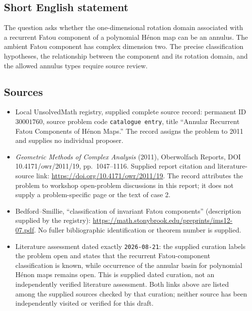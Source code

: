 \documentclass[11pt]{article}
\begin{document}
\subsection{Short English statement}
The question asks whether the one-dimensional rotation domain associated with a recurrent Fatou component of a polynomial H\'enon map can be an annulus. The ambient Fatou component has complex dimension two. The precise classification hypotheses, the relationship between the component and its rotation domain, and the allowed annulus types require source review.
\subsection{Sources}
\begin{itemize}
\item Local UnsolvedMath registry, supplied complete source record: permanent ID \(30001760\), source problem code \texttt{catalogue entry}, title ``Annular Recurrent Fatou Components of H\'enon Maps.'' The record assigns the problem to 2011 and supplies no individual proposer.
\item \emph{Geometric Methods of Complex Analysis} (2011), Oberwolfach Reports, DOI 10.4171/owr/2011/19, pp.\ 1047--1116. Supplied report citation and literature-source link: \url{https://doi.org/10.4171/owr/2011/19}. The record attributes the problem to workshop open-problem discussions in this report; it does not supply a problem-specific page or the text of case 2.
\item Bedford--Smillie, ``classification of invariant Fatou components'' (description supplied by the registry): \url{https://math.stonybrook.edu/preprints/ims12-07.pdf}. No fuller bibliographic identification or theorem number is supplied.
\item Literature assessment dated exactly \texttt{2026-08-21}: the supplied curation labels the problem open and states that the recurrent Fatou-component classification is known, while occurrence of the annular basin for polynomial H\'enon maps remains open. This is supplied dated curation, not an independently verified literature assessment. Both links above are listed among the supplied sources checked by that curation; neither source has been independently visited or verified for this draft.
\end{itemize}
\end{document}
